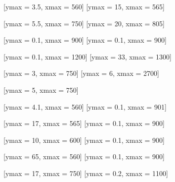 \documentclass[tikz]{standalone}
\begin{document}


%
%
%
%
%


\begin{minipage}[t]{600pt}
\begin{table*}

\end{table*}
\end{minipage}

\begin{minipage}[t]{600pt}
\begin{table*}

\end{table*}
\end{minipage}


[ymax = 3.5, xmax = 560]
[ymax = 15, xmax = 565]

[ymax = 5.5, xmax =  750]
[ymax =  20, xmax = 805]

[ymax = 0.1, xmax = 900]
[ymax = 0.1, xmax = 900]

[ymax =   0.1, xmax = 1200]
[ymax =   33, xmax = 1300]

[ymax =   3, xmax = 750]
[ymax =   6, xmax = 2700]

[ymax =   5, xmax = 750]

[ymax = 4.1, xmax = 560]
[ymax = 0.1, xmax = 901]

[ymax = 17, xmax = 565]
[ymax = 0.1, xmax = 900]

[ymax =  10, xmax = 600]
[ymax = 0.1, xmax = 900]

[ymax =  65, xmax = 560]
[ymax = 0.1, xmax = 900]

[ymax =  17, xmax =  750]
[ymax = 0.2, xmax = 1100]
\end{document}
